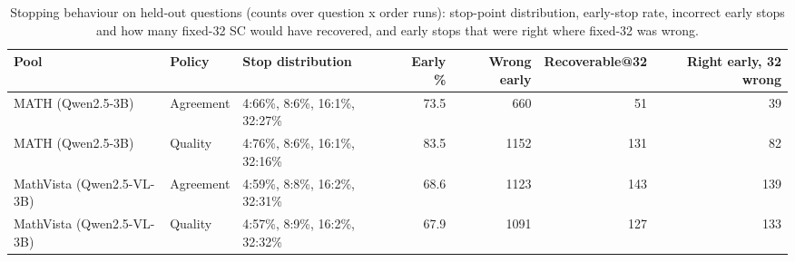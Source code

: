 \begin{table}[t]
\centering
\small
\caption{Stopping behaviour on held-out questions (counts over question x order runs): stop-point distribution, early-stop rate, incorrect early stops and how many fixed-32 SC would have recovered, and early stops that were right where fixed-32 was wrong.}
\label{tab:T9_stopping}
\begin{tabular}{lllrrrr}
\toprule
Pool & Policy & Stop distribution & Early \% & Wrong early & Recoverable@32 & Right early, 32 wrong \\
\midrule
MATH (Qwen2.5-3B) & Agreement & 4:66\%, 8:6\%, 16:1\%, 32:27\% & 73.5 & 660 & 51 & 39 \\
MATH (Qwen2.5-3B) & Quality & 4:76\%, 8:6\%, 16:1\%, 32:16\% & 83.5 & 1152 & 131 & 82 \\
MathVista (Qwen2.5-VL-3B) & Agreement & 4:59\%, 8:8\%, 16:2\%, 32:31\% & 68.6 & 1123 & 143 & 139 \\
MathVista (Qwen2.5-VL-3B) & Quality & 4:57\%, 8:9\%, 16:2\%, 32:32\% & 67.9 & 1091 & 127 & 133 \\
\bottomrule
\end{tabular}
\end{table}
